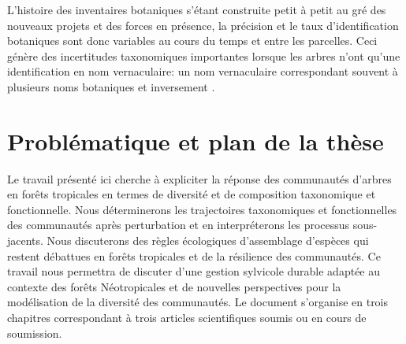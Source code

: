 \documentclass[
  11pt,
  french,
  A4paper,
  extrafontsizes,onecolumn,openright
  ]{memoir}
\begin{document}
L'histoire des inventaires botaniques s'étant construite petit à petit
au gré des nouveaux projets et des forces en présence, la précision et
le taux d'identification botaniques sont donc variables au cours du
temps et entre les parcelles. Ceci génère des incertitudes taxonomiques
importantes lorsque les arbres n'ont qu'une identification en nom
vernaculaire: un nom vernaculaire correspondant souvent à plusieurs noms
botaniques et inversement \autocite{Oldeman1968}.

\section{Problématique et plan de la
thèse}\label{problematique-et-plan-de-la-these}

Le travail présenté ici cherche à expliciter la réponse des communautés
d'arbres en forêts tropicales en termes de diversité et de composition
taxonomique et fonctionnelle. Nous déterminerons les trajectoires
taxonomiques et fonctionnelles des communautés après perturbation et en
interpréterons les processus sous-jacents. Nous discuterons des règles
écologiques d'assemblage d'espèces qui restent débattues en forêts
tropicales et de la résilience des communautés. Ce travail nous
permettra de discuter d'une gestion sylvicole durable adaptée au
contexte des forêts Néotropicales et de nouvelles perspectives pour la
modélisation de la diversité des communautés. Le document s'organise en
trois chapitres correspondant à trois articles scientifiques soumis ou
en cours de soumission.
\end{document}
